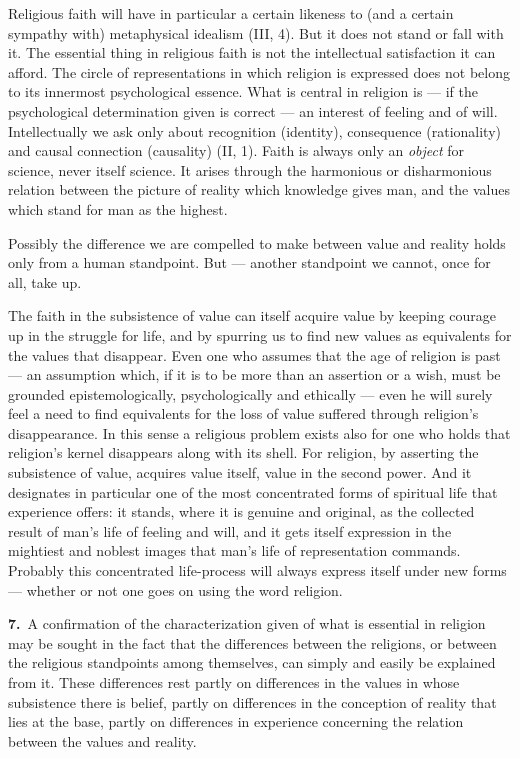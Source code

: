 \documentclass[12pt,a4paper]{book}
\newcommand{\opage}[1]{\marginnote{\footnotesize\textit{[#1]}}}
\begin{document}
Religious faith will have in particular a certain likeness to (and a certain
sympathy with) metaphysical idealism (III, 4). But it does not stand or fall with
it. The essential thing in religious faith is not the intellectual satisfaction
it can afford. The circle of representations in which religion is expressed does
not belong to its innermost psychological essence. What is central in religion is
--- if the psychological determination given is correct --- an interest of
feeling and of will. Intellectually we ask only about recognition (identity),
consequence (rationality) and causal connection (causality) (II, 1). Faith is
always only an \emph{object} for science, never itself science. It arises through
the harmonious or disharmonious relation between the picture of reality which
knowledge gives man, and the values which stand for man as the highest.

Possibly the difference we are compelled to make between value and reality holds
only from a human standpoint. But --- another standpoint we cannot, once for all,
take up.

The faith in the subsistence of value can itself acquire value by keeping courage
up in the struggle for life, and by spurring us to find new values as equivalents
for the values that disappear. Even one who assumes that the age of religion is
past --- an assumption which, if it is to be more than an assertion or a wish,
must be grounded epistemologically, psychologically and ethically --- even he
will surely feel a need to find equivalents for the loss of value suffered
through religion's disappearance. In this sense a religious problem exists \opage{82}also
for one who holds that religion's kernel disappears along with its shell. For
religion, by asserting the subsistence of value, acquires value itself, value in
the second power. And it designates in particular one of the most concentrated
forms of spiritual life that experience offers: it stands, where it is genuine
and original, as the collected result of man's life of feeling and will, and it
gets itself expression in the mightiest and noblest images that man's life of
representation commands. Probably this concentrated life-process will always
express itself under new forms --- whether or not one goes on using the word
religion.

\noindent\textbf{7.}~A confirmation of the characterization given of what is
essential in religion may be sought in the fact that the differences between the
religions, or between the religious standpoints among themselves, can simply and
easily be explained from it. These differences rest partly on differences in the
values in whose subsistence there is belief, partly on differences in the
conception of reality that lies at the base, partly on differences in experience
concerning the relation between the values and reality.
\end{document}
